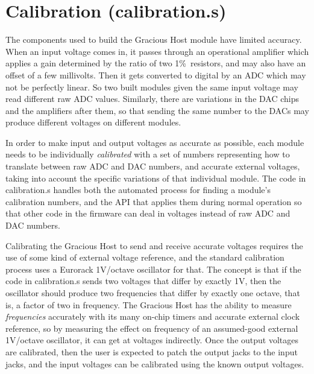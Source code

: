 
%
%
%
%
%
%

\chapter{Calibration (calibration.s)}

The components used to build the Gracious Host module have limited
accuracy.  When an input voltage comes in, it passes through an
operational amplifier which applies a gain determined by the ratio of two
1\%\ resistors, and may also have an offset of a few millivolts.  Then it
gets converted to digital by an ADC which may not be perfectly linear.  So
two built modules given the same input voltage may read different raw ADC
values.  Similarly, there are variations in the DAC chips and the amplifiers
after them, so that sending the same number to the DACs may produce
different voltages on different modules.

In order to make input and output voltages as accurate as possible, each
module needs to be individually \emph{calibrated} with a set of numbers
representing how to translate between raw ADC and DAC numbers, and accurate
external voltages, taking into account the specific variations of that
individual module.  The code in calibration.s handles both the automated
process for finding a module's calibration numbers, and the API that applies
them during normal operation so that other code in the firmware can deal in
voltages instead of raw ADC and DAC numbers.

Calibrating the Gracious Host to send and receive accurate voltages requires
the use of some kind of external voltage reference, and the standard
calibration process uses a Eurorack 1V/octave oscillator for that.  The
concept is that if the code in calibration.s sends two voltages that differ
by exactly 1V, then the oscillator should produce two frequencies that
differ by exactly one octave, that is, a factor of two in frequency.  The
Gracious Host has the ability to measure \emph{frequencies} accurately with
its many on-chip timers and accurate external clock reference, so by
measuring the effect on frequency of an assumed-good external 1V/octave
oscillator, it can get at voltages indirectly.  Once the output voltages are
calibrated, then the user is expected to patch the output jacks to the input
jacks, and the input voltages can be calibrated using the known output
voltages.

